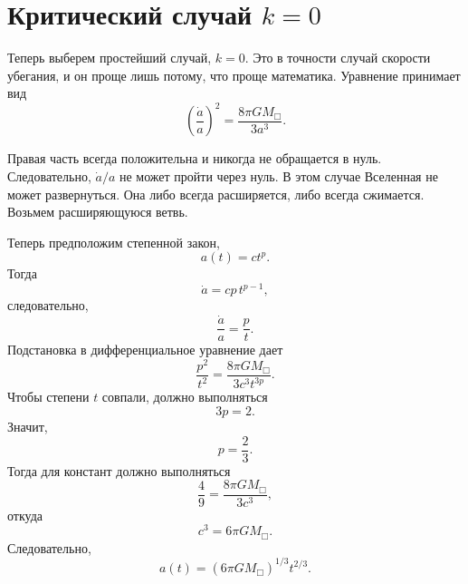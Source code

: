\begin{classroomqa}
\end{classroomqa}

\section{Критический случай \(k=0\)}

Теперь выберем простейший случай, \(k=0\). Это в точности случай скорости убегания, и он проще лишь потому, что проще математика. Уравнение принимает вид
\begin{equation}
\left(\frac{\dot a}{a}\right)^2=\frac{8\pi G M_{\Box}}{3a^3}.
\end{equation}

Правая часть всегда положительна и никогда не обращается в нуль. Следовательно, \(\dot a/a\) не может пройти через нуль. В этом случае Вселенная не может развернуться. Она либо всегда расширяется, либо всегда сжимается. Возьмем расширяющуюся ветвь.

Теперь предположим степенной закон,
\begin{equation}
a(t)=ct^p.
\end{equation}
Тогда
\begin{equation}
\dot a = cp\,t^{p-1},
\end{equation}
следовательно,
\begin{equation}
\frac{\dot a}{a}=\frac{p}{t}.
\end{equation}
Подстановка в дифференциальное уравнение дает
\begin{equation}
\frac{p^2}{t^2}=\frac{8\pi G M_{\Box}}{3c^3t^{3p}}.
\end{equation}
Чтобы степени \(t\) совпали, должно выполняться
\begin{equation}
3p=2.
\end{equation}
Значит,
\begin{equation}
p=\frac{2}{3}.
\end{equation}
Тогда для констант должно выполняться
\begin{equation}
\frac{4}{9}=\frac{8\pi G M_{\Box}}{3c^3},
\end{equation}
откуда
\begin{equation}
c^3=6\pi G M_{\Box}.
\end{equation}
Следовательно,
\begin{equation}
a(t)=\left(6\pi G M_{\Box}\right)^{1/3}t^{2/3}.
\end{equation}

